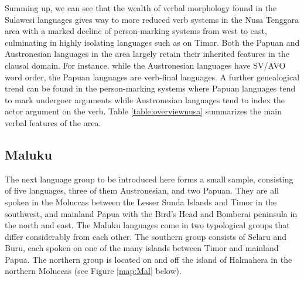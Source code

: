 Summing up, we can see that the wealth of verbal morphology found in the Sulawesi languages gives way to more reduced verb systems in the Nusa Tenggara area with a marked decline of person-marking systems from west to east, culminating in highly isolating languages such as  on Timor. Both the Papuan and Austronesian languages in the area largely retain their inherited features in the clausal domain. For instance, while the Austronesian languages have SV/AVO word order, the Papuan languages are verb-final languages. A further genealogical trend can be found in the person-marking systems where Papuan languages tend to mark undergoer arguments while Austronesian languages tend to index the actor argument on the verb. Table \ref{table:overviewnusa} summarizes the main verbal features of the area.

\begin{table}[h]
\caption[Basic verbal features of Nusa Tenggara languages]{Overview of basic verbal features of the Nusa Tenggara languages in the EI data set. Constituent order lists only the basic pattern, pragmatically induced alternative patterns are often also possible. Brackets around person marking formulae indicate that the system does not apply to all verbs in all contexts. Grouping of languages is roughly according to the discussion in the prose.}
\label{table:overviewnusa}
\end{table}

\subsection{Maluku} \label{sec:maluku}

The next language group to be introduced here forms a small sample, consisting of five languages, three of them Austronesian, and two Papuan. They are all spoken in the Moluccas between the Lesser Sunda Islands and Timor in the southwest, and mainland Papua with the Bird's Head and Bomberai peninsula in the north and east. The Maluku languages come in two typological groups that differ considerably from each other. The southern group consists of Selaru and Buru, each spoken on one of the many islands between Timor and mainland Papua. The northern group is located on and off the island of Halmahera in the northern Moluccas (see Figure \ref{map:Mal} below).

